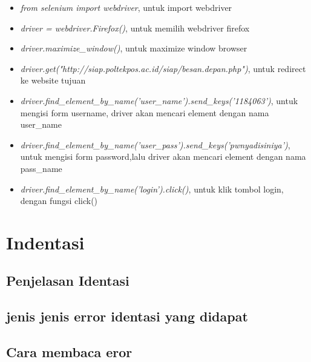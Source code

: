 \documentclass{article}
\begin{document}
\begin{itemize}
	\item \textit{from selenium import webdriver}, untuk import webdriver
	\item \textit{driver = webdriver.Firefox()},  untuk memilih webdriver firefox
	\item \textit{driver.maximize\_window()},  untuk maximize window browser
	\item \textit{driver.get("http://siap.poltekpos.ac.id/siap/besan.depan.php")}, untuk redirect ke website tujuan
	\item \textit{driver.find\_element\_by\_name('user\_name').send\_keys('1184063')}, untuk mengisi form username, driver akan mencari element dengan nama user\_name
	\item \textit{driver.find\_element\_by\_name('user\_pass').send\_keys('pwnyadisiniya')}, untuk mengisi form password,lalu driver akan mencari element dengan nama pass\_name
	\item \textit{driver.find\_element\_by\_name('login').click()}, untuk klik tombol login, dengan fungsi click()
\end{itemize}

\section{Indentasi}
\subsection{Penjelasan Identasi }
\usepackage{Indentasi merupakan suatu cara perapihan sintaks atau sebagi aturan dalam Bahasa pemrogaman yang akan ditulis. Indentasi digunakan untuk acuan scope pemrograman dan compiler seperti Bahasa pemrograman python. Indentasi ditandai atau berkaitan dengan kurung kurawal ‘’ untuk memulai atau mengakhiri suatu scope permasalahan. Indentasi sering menjadi suatu kebiasaan atau khas dari seorang programmer. Biasanya indentasi dipakai untuk sekedar memudahkan pembacaan kode program, namun dalam Python,Fungsi indentasi sebagai penanda blok kode program.}

\subsection{ jenis jenis error identasi yang didapat}
\usepackage{script pada spyder tidak sesuai posisi, contohnya penulisan script terlalu menjorok atau penulisan yg kurang menjorok ke dalam }

\subsection{Cara membaca eror}
\usepackage{ untuk mengetahui jenis errornya dapat diketahui melalui IndentitionError: expected an idented block. untuk menghindari error ini bisa menggunakan fungsi if memerlukan identasi untuk membedakannya.}
\end{document}
